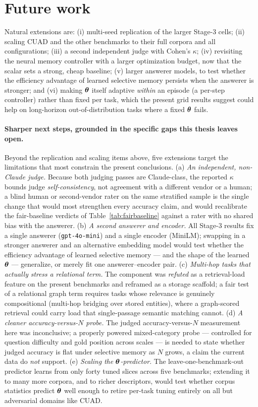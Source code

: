 \section{Future work}
Natural extensions are: (i) multi-seed replication of the larger Stage-3 cells;
(ii) scaling CUAD and the other benchmarks to their full corpora and all
configurations; (iii) a second independent judge with Cohen's $\kappa$; (iv)
revisiting the neural memory controller with a larger optimization budget, now
that the scalar \Vfour{} sets a strong, cheap baseline; (v) larger answerer
models, to test whether the efficiency advantage of learned selective memory
persists when the answerer is stronger; and (vi) making $\boldsymbol{\theta}$ itself
adaptive \emph{within} an episode (a per-step controller) rather than fixed per
task, which the present grid results suggest could help on long-horizon
out-of-distribution tasks where a fixed $\boldsymbol{\theta}$ fails.

\paragraph{Sharper next steps, grounded in the specific gaps this thesis leaves open.}
Beyond the replication and scaling items above, five extensions target the
limitations that most constrain the present conclusions. (a) \emph{An
independent, non-Claude judge.} Because both judging passes are Claude-class, the
reported $\kappa$ bounds judge \emph{self-consistency}, not agreement with a
different vendor or a human; a blind human or second-vendor rater on the same
stratified sample is the single change that would most strengthen every
accuracy claim, and would recalibrate the fair-baseline verdicts of
Table~\ref{tab:fairbaseline} against a rater with no shared bias with the answerer.
(b) \emph{A second answerer and encoder.} All Stage-3 results fix a single
answerer (\texttt{gpt-4o-mini}) and a single encoder (MiniLM); swapping in a
stronger answerer and an alternative embedding model would test whether the
efficiency advantage of learned selective memory --- and the shape of the learned
$\boldsymbol{\theta}$ --- generalize, or merely fit one answerer--encoder pair. (c)
\emph{Multi-hop tasks that actually stress a relational term.} The \wgraph{}
component was \emph{refuted} as a retrieval-load feature on the present
benchmarks and reframed as a storage scaffold; a fair test of a relational graph
term requires tasks whose relevance is genuinely compositional (multi-hop
bridging over stored entities), where a graph-scored retrieval could carry load
that single-passage semantic matching cannot. (d) \emph{A cleaner
accuracy-versus-$N$ probe.} The judged accuracy-versus-$N$ measurement here was
inconclusive; a properly powered mixed-category probe --- controlled for question
difficulty and gold position across scales --- is needed to state whether judged
accuracy is flat under selective memory as $N$ grows, a claim the current data do
\emph{not} support. (e) \emph{Scaling the $\boldsymbol{\theta}$-predictor.} The
leave-one-benchmark-out predictor learns from only forty tuned slices across five
benchmarks; extending it to many more corpora, and to richer descriptors, would
test whether corpus statistics predict $\boldsymbol{\theta}$ well enough to retire per-task
tuning entirely on all but adversarial domains like CUAD.

